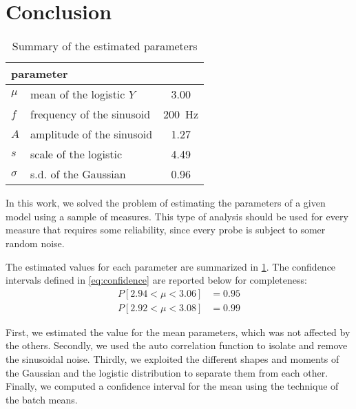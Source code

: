 \section{Conclusion}
\label{sec:conclusion}

\begin{table}
	\centering
	\caption{Summary of the estimated parameters}
	\label{tab:summary}
	\begin{tabular}{l>{\raggedright}p{3cm}c}
    	\toprule
    		\multicolumn{2}{l}{parameter} & \multicolumn{1}{c}{value} \\
    	\midrule
    		$\mu$    & mean of the logistic $Y$  & 3.00              \\
    		$f$      & frequency of the sinusoid & \SI{200}{\hertz}  \\
    		$A$      & amplitude of the sinusoid & 1.27              \\
    		$s$      & scale of the logistic     & 4.49              \\
    		$\sigma$ & s.d. of the Gaussian      & 0.96              \\
    	\bottomrule
	\end{tabular}
\end{table}


In this work, we solved the problem of estimating the parameters of a given model using a sample of measures.
This type of analysis should be used for every measure that requires some reliability, since every probe is subject to somer random noise.

The estimated values for each parameter are summarized in \cref{tab:summary}.
The confidence intervals defined in \cref{eq:confidence} are reported below for completeness:
\begin{align*}
    P[2.94 < \mu < 3.06] &= 0.95 \\
    P[2.92 < \mu < 3.08] &= 0.99
\end{align*}

First, we estimated the value for the mean parameters, which was not affected by the others.
Secondly, we used the auto correlation function to isolate and remove the sinusoidal noise.
Thirdly, we exploited the different shapes and moments of the Gaussian and the logistic distribution to separate them from each other.
Finally, we computed a confidence interval for the mean using the technique of the batch means.
